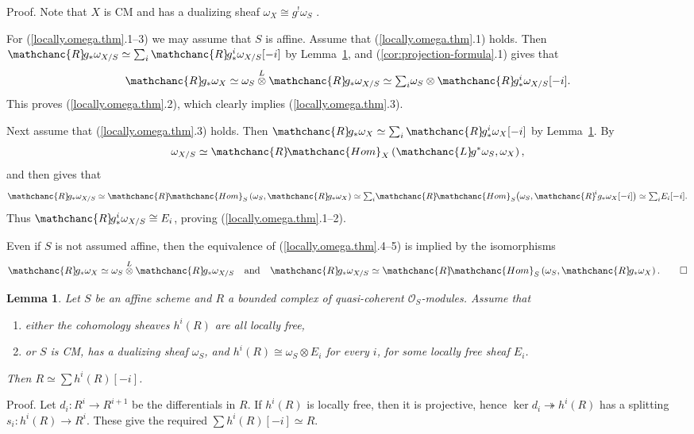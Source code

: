 \documentclass{amsart}
\newtheorem{lem}[thm]{Lemma}
\theoremstyle{definition}
\theoremstyle{remark}
\renewcommand{\o}[0]{{\mathcal O}}
\newcommand{\qtq}[1]{\quad\mbox{#1}\quad}
\newcommand{\onto}[0]{\twoheadrightarrow}
\newcommand{\tsum}[0]{\textstyle{\sum}}
\newcommand{\myR}{{\mathchanc{R}\!}}
\newcommand{\lotimes}{\overset{L}{\otimes}}
\newcommand{\myL}{{\mathchanc{L}\!}}
\newcommand{\sHom}[0]{{\mathchanc{Hom}}}
\begin{document}
 Proof. Note that $X$ is CM and has a dualizing sheaf $\omega_X\cong g^!\omega_S$ \cite[\href{https://stacks.math.columbia.edu/tag/0AA3
[stacks.math.columbia.edu]}{Tag0AA3}]{stacks-project}.


 For (\ref{locally.omega.thm}.1--3) we may assume that $S$ is affine. Assume that (\ref{locally.omega.thm}.1) holds.
 Then $\myR g_*\omega_{X/S}\simeq \sum_i\myR g^i_*\omega_{X/S}[-i]$ by Lemma~\ref{split.lem.2}, 
 and  (\ref{cor:projection-formula}.1) gives that
  $$
 \myR g_*\omega_X\simeq \omega_S\lotimes\myR g_*\omega_{X/S}
 \simeq \tsum_i \omega_S\otimes \myR g^i_*\omega_{X/S}[-i].
   $$
 This proves (\ref{locally.omega.thm}.2), which clearly implies
 (\ref{locally.omega.thm}.3).


 Next assume that (\ref{locally.omega.thm}.3) holds.
 Then $\myR g_*\omega_{X}\simeq \sum_i\myR g^i_*\omega_{X}[-i]$ by Lemma~\ref{split.lem.2}.   By \cite[3.3.6]{Conrad00}
 $$
 \omega_{X/S}
 \simeq \myR\sHom_X\left(\myL g^*\omega_S,\omega_X\right),
 $$
  and then
\cite[\href{https://stacks.math.columbia.edu/tag/08DJ}{Tag 08DJ}]{stacks-project}
 gives that
 $$
 \myR g_*\omega_{X/S}\simeq \myR\sHom_S\left(\omega_S,\myR
 g_*\omega_X\right)\simeq
 \tsum_i\myR\sHom_S\big(\omega_S,\myR^i g_*\omega_X[-i]\big)\simeq
 \tsum_i E_i[-i].
 $$
 Thus $\myR g^i_*\omega_{X/S}\cong E_i$, proving
 (\ref{locally.omega.thm}.1--2).

 Even if $S$ is not assumed affine, then the equivalence of (\ref{locally.omega.thm}.4--5) is implied by the isomorphisms
 $$
 \myR g_*\omega_X\simeq \omega_S\lotimes\myR g_*\omega_{X/S}
 \qtq{and}
 \myR g_*\omega_{X/S}\simeq \myR\sHom_S\left(\omega_S,\myR
 g_*\omega_X\right). \hfill \qed
 $$

 \begin{lem} \label{split.lem.2}
   Let $S$ be an affine scheme
   and  $R$  a bounded complex of quasi-coherent $\o_S$-modules.  
   Assume that
   \begin{enumerate}
   \item either the cohomology sheaves  $h^i(R)$ are all locally free,
   \item or   $S$ is CM,  has a dualizing sheaf $\omega_S$, and $h^i(R)\cong \omega_S\otimes E_i$   for every $i$, for some locally free sheaf $E_i$.
  \end{enumerate}
  Then   $R\simeq \sum h^i(R)[-i]$.
  \end{lem}

 Proof.   Let $d_i:R^i\to R^{i+1}$ be the differentials in $R$.
 If $h^i(R)$ is locally free, then it is projective, hence
 $\ker d_i\onto h^i(R)$ has a splitting $s_i: h^i(R)\to R^i$.
 These give the required $\sum h^i(R)[-i]\simeq R$.
\end{document}
